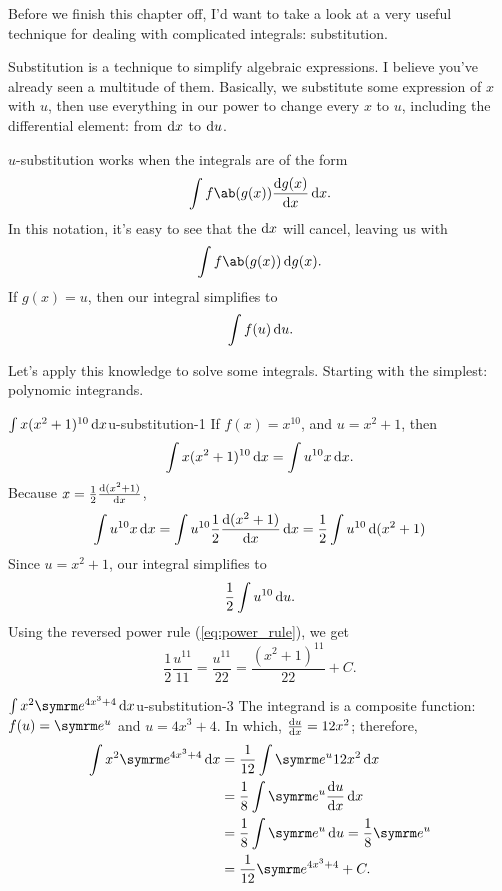 Before we finish this chapter off, I'd want to take a look at a very useful technique for dealing with complicated integrals: substitution.

Substitution is a technique to simplify algebraic expressions. I believe you've already seen a multitude of them. Basically, we substitute some expression of $x$ with $u$, then use everything in our power to change every $x$ to $u$, including the differential element: from $\odif{x}$ to $\odif{u}$.

$u$-substitution works when the integrals are of the form
\begin{equation}
	\int f\ab(g(x))\odv{g(x)}{x}\odif{x}.
\end{equation}
In this notation, it's easy to see that the $\odif{x}$ will cancel, leaving us with
\begin{equation}
	\int f\ab(g(x))\odif{g(x)}.
\end{equation}
If $g(x) = u$, then our integral simplifies to
\begin{equation}
	\int f(u)\odif{u}.
\end{equation}

Let's apply this knowledge to solve some integrals. Starting with the simplest: polynomic integrands.
\begin{exmp}{$\int x(x^2 + 1)^{10}\odif{x}$}{u-substitution-1}
	If $f(x) = x^{10}$, and $u = x^2 + 1$, then
	\begin{equation}
		\int x(x^2 + 1)^{10}\odif{x} = \int u^{10}x\odif{x}.
	\end{equation}
	Because $x = \frac{1}{2}\odv{(x^2 + 1)}{x}$,
	\begin{equation}
		\int u^{10}x\odif{x} = \int u^{10}\frac{1}{2}\odv{(x^2 + 1)}{x}\odif{x} = \frac{1}{2}\int u^{10}\odif{(x^2 + 1)}
	\end{equation}
	Since $u = x^2 + 1$, our integral simplifies to
	\begin{equation}
		\frac{1}{2}\int u^{10}\odif{u}.
	\end{equation}
	Using the reversed power rule (\cref{eq:power_rule}), we get
	\begin{equation}
		\frac{1}{2}\frac{u^{11}}{11} = \frac{u^{11}}{22} = \frac{(x^2 + 1)^{11}}{22} + C.
	\end{equation}
\end{exmp}

\begin{exmp}{$\int x^2\e^{4x^3 + 4}\odif{x}$}{u-substitution-3}
	The integrand is a composite function: $f(u) = \e^u$ and $u = 4x^3 + 4$. In which, $\odv{u}{x} = 12x^2$; therefore,
	\begin{align}
		\int x^2\e^{4x^3 + 4}\odif{x} &= \frac{1}{12}\int\e^u 12x^2 \odif{x} \\
										&= \frac{1}{8}\int\e^u\odv{u}{x}\odif{x} \\
										&= \frac{1}{8}\int\e^u\odif{u} = \frac{1}{8}\e^u \\
										&= \frac{1}{12}\e^{4x^3 + 4} + C.
	\end{align}
\end{exmp}

